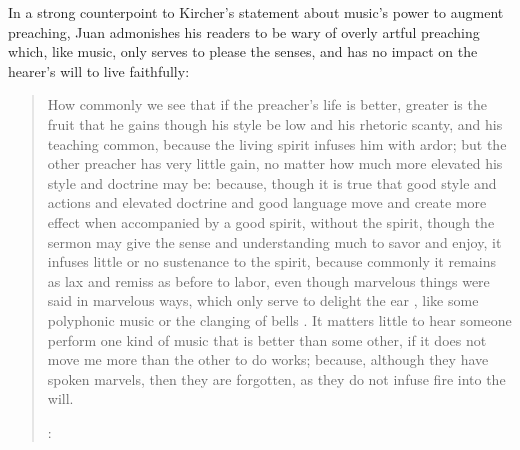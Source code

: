 In a strong counterpoint to Kircher's statement about music's power to augment preaching, Juan admonishes his readers to be wary of overly artful preaching which, like music, only serves to please the senses, and has no impact on the hearer's will to live faithfully:
\begin{quote}
  How commonly we see that \Dots{} if the preacher's life is better, greater is the fruit that he gains though his style be low and his rhetoric scanty, and his teaching common, because the living spirit infuses him with ardor;
  but the other preacher has very little gain, no matter how much more elevated his style and doctrine may be: because, though it is true that good style and actions and elevated doctrine and good language move and create more effect when accompanied by a good spirit, without the spirit, though the sermon may give the sense and understanding much to savor and enjoy, it infuses little or no sustenance to the spirit, because commonly it remains as lax and remiss as before to labor, even though marvelous things were said in marvelous ways, which only serve to delight the ear , like some polyphonic music  or the clanging of bells \Dots{}.
  It matters little to hear someone perform one kind of music that is better than some other, if it does not move me more than the other to do works; because, although they have spoken marvels, then they are forgotten, as they do not infuse fire into the will.%
  \begin{Footnote}
    \Autocite[bk.~3, ch.~45, 425]{JuandelaCruz:Subida}:
  \end{Footnote}
\end{quote}

